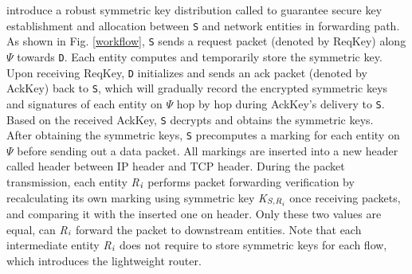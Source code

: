 \name{} introduce a robust symmetric key distribution called \namekey{} to guarantee secure key establishment and allocation between {\tt S} and network entities in forwarding path. As shown in Fig. \ref{workflow}, {\tt S} sends a request packet (denoted by ReqKey) along $\Psi$ towards {\tt D}. Each entity computes and temporarily store the symmetric key. Upon receiving ReqKey, {\tt D} initializes and sends an ack packet (denoted by AckKey) back to {\tt S}, which will gradually record the encrypted symmetric keys and signatures of each entity on $\Psi$ hop by hop during AckKey's delivery to {\tt S}.
Based on the received AckKey, {\tt S} decrypts and obtains the symmetric keys.\\
After obtaining the symmetric keys, {\tt S} precomputes a marking for each entity on $\Psi$ before sending out a data packet. All markings are inserted into a new header called \name{} header between IP header and TCP header.
During the packet transmission, each entity \emph{R}$_\emph{i}$ performs packet forwarding verification by recalculating its own marking using symmetric key \emph{K}$_{\emph{S,R}_\emph{i}}$ once receiving packets, and comparing it with the inserted one on \name{} header. Only these two values are equal, can \emph{R}$_\emph{i}$ forward the packet to downstream entities. Note that each intermediate entity \emph{R}$_\emph{i}$ does not require to store symmetric keys for each flow, which introduces the lightweight \name{} router.\\

